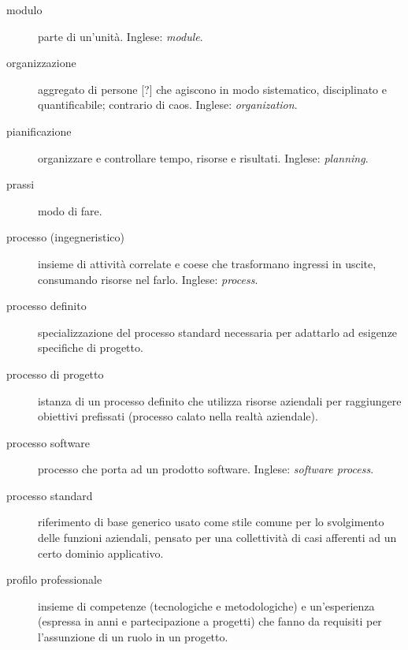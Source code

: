 \documentclass[a4paper]{article}
\begin{document}
\begin{description}
	\item[modulo] 

			parte di un'unità. Inglese: \emph{module}.
			
	\item[organizzazione] 

			aggregato di persone [?] che agiscono in modo sistematico, disciplinato e quantificabile; contrario di caos. Inglese: \emph{organization}.
			
	\item[pianificazione] 

			organizzare e controllare tempo, risorse e risultati. Inglese: \emph{planning}.
			
	\item[prassi] 

			modo di fare.
			
	\item[processo (ingegneristico)] 

			insieme di attività correlate e coese che trasformano ingressi in uscite, consumando risorse nel farlo. Inglese: \emph{process}.
			
	\item[processo definito] 

			specializzazione del processo standard necessaria per adattarlo ad esigenze specifiche di progetto.
			
	\item[processo di progetto] 

			istanza di un processo definito che utilizza risorse aziendali per raggiungere obiettivi prefissati (processo calato nella realtà aziendale).
			
	\item[processo software] 

			processo che porta ad un prodotto software. Inglese: \emph{software process}.
			
	\item[processo standard] 

			riferimento di base generico usato come stile comune per lo svolgimento delle funzioni aziendali, pensato per una collettività di casi afferenti ad un certo dominio applicativo.
			
	\item[profilo professionale] 

			insieme di competenze (tecnologiche e metodologiche) e un'esperienza (espressa in anni e partecipazione a progetti) che fanno da requisiti per l'assunzione di un ruolo in un progetto.
			

\end{description}
\end{document}
